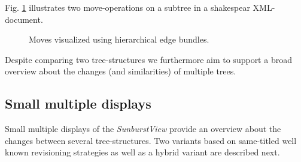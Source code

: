 Fig. \ref{fig:moves} illustrates two move-operations on a subtree in a shakespear XML-document.

\begin{figure}[tb]
\caption{\label{fig:moves} Moves visualized using hierarchical edge bundles.}
\end{figure}

Despite comparing two tree-structures we furthermore aim to support a broad overview about the changes (and similarities) of multiple trees.

\subsection{Small multiple displays}\label{subsec::smallmultiple}
Small multiple displays of the \emph{SunburstView} provide an overview about the changes between several tree-structures. Two variants based on same-titled well known revisioning strategies as well as a hybrid variant are described next.

